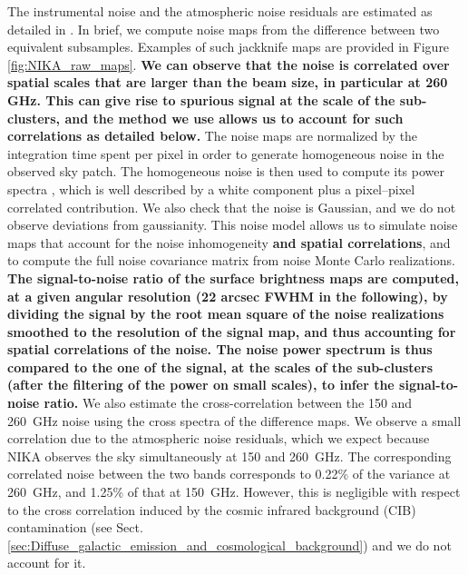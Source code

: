 \documentclass[twocolumn,traditabstract]{aa}
\begin{document}
The instrumental noise and the atmospheric noise residuals are estimated as detailed in \cite{Adam2016}. In brief, we compute noise maps from the difference between two equivalent subsamples. Examples of such jackknife maps are provided in Figure \ref{fig:NIKA_raw_maps}. {\bf We can observe that the noise is correlated over spatial scales that are larger than the beam size, in particular at 260 GHz. This can give rise to spurious signal at the scale of the sub-clusters, and the method we use allows us to account for such correlations as detailed below.} The noise maps are normalized by the integration time spent per pixel in order to generate homogeneous noise in the observed sky patch. The homogeneous noise is then used to compute its power spectra \cite[using the POKER software,][]{Ponthieu2011}, which is well described by a white component plus a pixel--pixel correlated contribution. We also check that the noise is Gaussian, and we do not observe deviations from gaussianity. This noise model allows us to simulate noise maps that account for the noise inhomogeneity {\bf and spatial correlations}, and to compute the full noise covariance matrix from noise Monte Carlo realizations. {\bf The signal-to-noise ratio of the surface brightness maps are computed, at a given angular resolution (22 arcsec FWHM in the following), by dividing the signal by the root mean square of the noise realizations smoothed to the resolution of the signal map, and thus accounting for spatial correlations of the noise. The noise power spectrum is thus compared to the one of the signal, at the scales of the sub-clusters (after the filtering of the power on small scales), to infer the signal-to-noise ratio.} We also estimate the cross-correlation between the 150 and 260~GHz noise using the cross spectra of the difference maps. We observe a small correlation due to the atmospheric noise residuals, which we expect because NIKA observes the sky simultaneously at 150 and 260~GHz. The corresponding correlated noise between the two bands corresponds to 0.22\% of the variance at 260~GHz, and 1.25\% of that at 150~GHz. However, this is negligible with respect to the cross correlation induced by the cosmic infrared background (CIB) contamination (see Sect.~ \ref{sec:Diffuse_galactic_emission_and_cosmological_background}) and we do not account for it.

\end{document}
